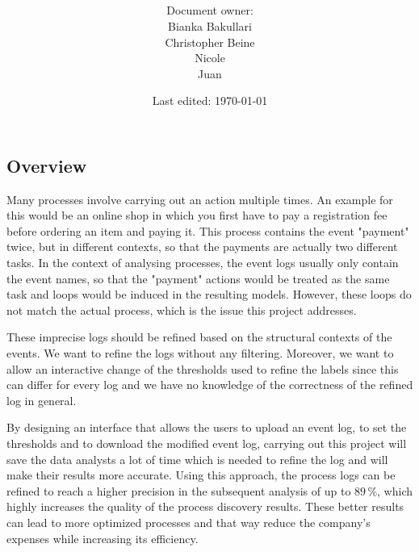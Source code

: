 \documentclass[notitlepage]{article}
\title{%
	\documentName\text{ } \\
  \large \projectName\text{ } \\
  }
\author{
	\large Document owner:\\
	Bianka Bakullari\\
	\texttt{}
	Christopher Beine\\
	\texttt{}
	Nicole\\
	\texttt{}
	Juan\\
	\texttt{}
}
\date{\small{Last edited: \today}}
\begin{document}
\begin{titlepage}
\clearpage\maketitle			%
\thispagestyle{fancy}
\tableofcontents
\end{titlepage}

\rfoot{\thepage}				%


\begin{flushleft}				%

\section{Overview}
Many processes involve carrying out an action multiple times. An example for this would be an online shop in which you first have to pay a registration fee before ordering an item and paying it. This process contains the event "payment" twice, but in different contexts, so that the payments are actually two different tasks. In the context of analysing processes, the event logs usually only contain the event names, so that the "payment" actions would be treated as the same task and loops would be induced in the resulting models. However, these loops do not match the actual process, which is the issue this project addresses. 

These imprecise logs should be refined based on the structural contexts of the events. We want to refine the logs without any filtering. Moreover, we want to allow an interactive change of the thresholds used to refine the labels since this can differ for every log and we have no knowledge of the correctness of the refined log in general.

By designing an interface that allows the users to upload an event log, to set the thresholds and to download the modified event log, carrying out this project will save the data analysts a lot of time which is needed to refine the log and will make their results more accurate.  Using this approach, the process logs can be refined to reach a higher precision in the subsequent analysis of up to $89 \, \% $, which highly increases the quality of the process discovery results. These better results can lead to more optimized processes and that way reduce the company's expenses while increasing its efficiency. 



\end{flushleft}
\end{document}
